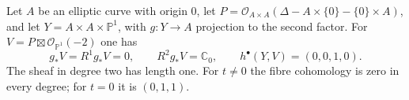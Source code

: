 
\begin{proposition}\hypertarget{tag-01GJ}{}\label{cdp:st:E12}


Let $A$ be an elliptic curve with origin $0$, let
$P=\mathcal O_{A\times A}(\Delta-A\times\{0\}-\{0\}\times A)$,
and let $Y=A\times A\times\mathbb P^1$, with $g:Y\to A$
projection to the second factor. For
$V=P\boxtimes\mathcal O_{\mathbb P^1}(-2)$ one has
\[
 g_*V=R^1g_*V=0,\qquad R^2g_*V=\mathbb C_0,
 \qquad h^\bullet(Y,V)=(0,0,1,0).
\]
The sheaf in degree two has length one. For $t\ne0$ the fibre
cohomology is zero in every degree; for $t=0$ it is $(0,1,1)$.
\end{proposition}

